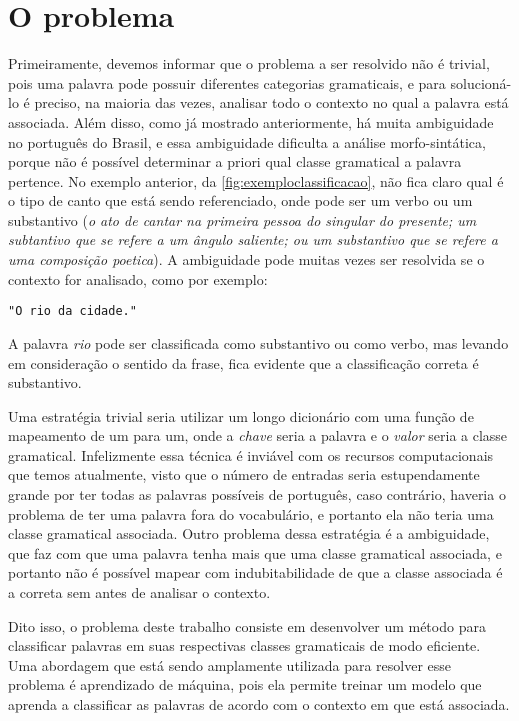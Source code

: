 \chapter{O problema}\label{oproblema}

Primeiramente, devemos informar que o problema a ser resolvido não é trivial, pois uma palavra pode possuir diferentes categorias gramaticais, e para solucioná-lo é  preciso, na maioria das vezes, analisar todo o contexto no qual a palavra está associada. Além disso, como já mostrado anteriormente, há muita ambiguidade no português do Brasil, e essa ambiguidade dificulta a análise morfo-sintática, porque não é possível determinar a priori qual classe gramatical a palavra pertence. No exemplo anterior, da \autoref{fig:exemploclassificacao}, não fica claro qual é o tipo de canto que está sendo referenciado, onde pode ser um verbo ou um substantivo (\textit{o ato de cantar na primeira pessoa do singular do presente; um subtantivo que se refere a um ângulo saliente; ou um substantivo que se refere a uma composição poetica}). A ambiguidade pode muitas vezes ser resolvida se o contexto for analisado, como por exemplo:

\begin{center}
\texttt{"O rio da cidade."}
\end{center}

A palavra \textit{rio} pode ser classificada como substantivo ou como verbo, mas levando em consideração o sentido da frase, fica evidente que a classificação correta é substantivo.

Uma estratégia trivial seria utilizar um longo dicionário com uma função de mapeamento de um para um, onde a \textit{chave} seria a palavra e o \textit{valor} seria a classe gramatical. Infelizmente essa técnica é inviável com os recursos computacionais que temos atualmente, visto que o número de entradas seria estupendamente grande por ter todas as palavras possíveis de português, caso contrário, haveria o
problema de ter uma palavra fora do vocabulário, e portanto ela não teria uma classe gramatical associada. Outro problema dessa estratégia é a ambiguidade, que faz com que uma palavra tenha mais que uma classe gramatical associada, e portanto não é possível mapear com indubitabilidade de que a classe associada é a correta sem antes de analisar o contexto.

Dito isso, o problema deste trabalho consiste em desenvolver um método para classificar palavras em suas respectivas classes gramaticais de modo eficiente. Uma abordagem que está sendo amplamente utilizada para resolver esse problema é aprendizado de máquina, pois ela permite treinar um modelo que aprenda a classificar as palavras de acordo com o contexto em que está associada. 

